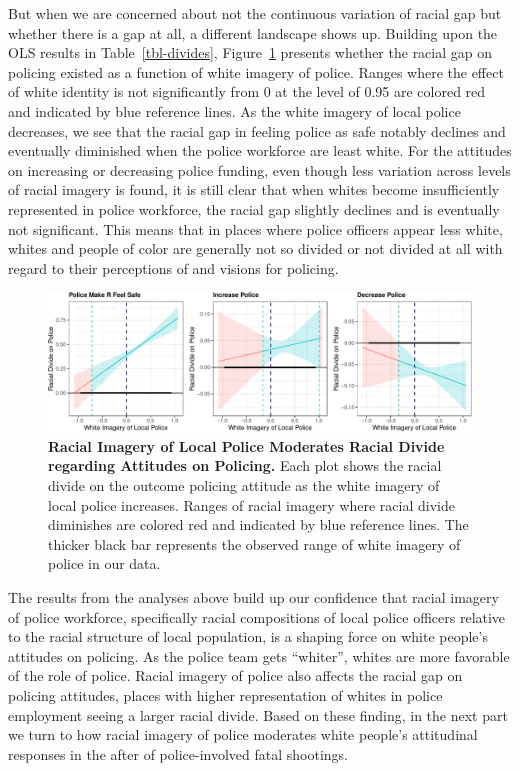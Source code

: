 \documentclass[
  12pt,
]{article}
\begin{document}
But when we are concerned about not the continuous variation of racial
gap but whether there is a gap at all, a different landscape shows up.
Building upon the OLS results in Table~\ref{tbl-divides},
Figure~\ref{fig-divides} presents whether the racial gap on policing
existed as a function of white imagery of police. Ranges where the
effect of white identity is not significantly from 0 at the level of
0.95 are colored red and indicated by blue reference lines. As the white
imagery of local police decreases, we see that the racial gap in feeling
police as safe notably declines and eventually diminished when the
police workforce are least white. For the attitudes on increasing or
decreasing police funding, even though less variation across levels of
racial imagery is found, it is still clear that when whites become
insufficiently represented in police workforce, the racial gap slightly
declines and is eventually not significant. This means that in places
where police officers appear less white, whites and people of color are
generally not so divided or not divided at all with regard to their
perceptions of and visions for policing.

\begin{figure}[tb]

{\centering \includegraphics{racialized-police_files/figure-pdf/fig-divides-1.pdf}

}

\caption{\label{fig-divides}\textbf{Racial Imagery of Local Police
Moderates Racial Divide regarding Attitudes on Policing.} Each plot
shows the racial divide on the outcome policing attitude as the white
imagery of local police increases. Ranges of racial imagery where racial
divide diminishes are colored red and indicated by blue reference lines.
The thicker black bar represents the observed range of white imagery of
police in our data.}

\end{figure}

The results from the analyses above build up our confidence that racial
imagery of police workforce, specifically racial compositions of local
police officers relative to the racial structure of local population, is
a shaping force on white people's attitudes on policing. As the police
team gets ``whiter'', whites are more favorable of the role of police.
Racial imagery of police also affects the racial gap on policing
attitudes, places with higher representation of whites in police
employment seeing a larger racial divide. Based on these finding, in the
next part we turn to how racial imagery of police moderates white
people's attitudinal responses in the after of police-involved fatal
shootings.
\end{document}
